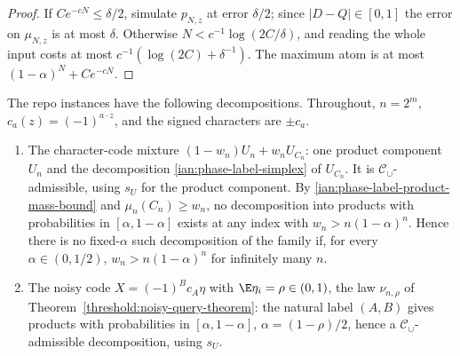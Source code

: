 \begin{proof}
If \(Ce^{-cN}\le\delta/2\), simulate \(p_{N,z}\) at error \(\delta/2\);
since \(|D-Q|\in[0,1]\) the error on \(\mu_{N,z}\) is at most \(\delta\).
Otherwise \(N<c^{-1}\log(2C/\delta)\), and reading the whole input costs
at most \(c^{-1}(\log(2C)+\delta^{-1})\). The maximum atom is at most
\((1-\alpha)^N+Ce^{-cN}\).
\end{proof}

The repo instances have the following decompositions. Throughout,
\(n=2^m\), \(c_a(z)=(-1)^{a\cdot z}\), and the signed characters are
\(\pm c_a\).

\begin{enumerate}
\item The character-code mixture \((1-w_n)U_n+w_nU_{C_n}\): one product
component \(U_n\) and the decomposition
\eqref{ian:phase-label-simplex} of \(U_{C_n}\). It is
\(\mathcal C_\cup\)-admissible, using \(s_U\) for the product
component. By \eqref{ian:phase-label-product-mass-bound} and
\(\mu_n(C_n)\ge w_n\), no decomposition into products with probabilities
in \([\alpha,1-\alpha]\) exists at any index with \(w_n>n(1-\alpha)^n\).
Hence there is no fixed-\(\alpha\) such decomposition of the family if,
for every \(\alpha\in(0,1/2)\), \(w_n>n(1-\alpha)^n\) for infinitely many
\(n\).

\item The noisy code \(X=(-1)^Bc_A\eta\) with \(\E\eta_i=\rho\in(0,1)\),
the law \(\nu_{n,\rho}\) of Theorem~\ref{threshold:noisy-query-theorem}:
the natural label \((A,B)\) gives products with probabilities in
\([\alpha,1-\alpha]\), \(\alpha=(1-\rho)/2\), hence a
\(\mathcal C_\cup\)-admissible decomposition, using \(s_U\).


\end{enumerate}
